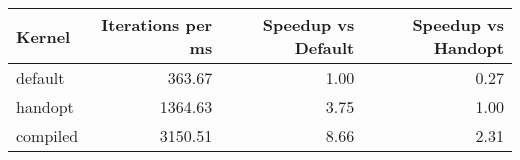 \begin{tabular}{lrrr}
\toprule
Kernel & Iterations per ms & Speedup vs Default & Speedup vs Handopt \\
\midrule
default & 363.67 & 1.00 & 0.27 \\
handopt & 1364.63 & 3.75 & 1.00 \\
compiled & 3150.51 & 8.66 & 2.31 \\
\bottomrule
\end{tabular}
